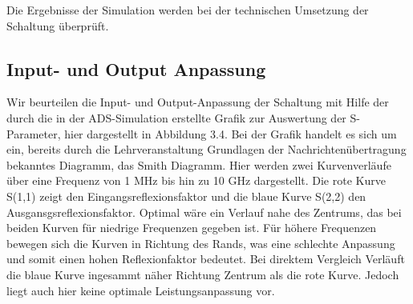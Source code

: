 Die Ergebnisse der Simulation werden bei der technischen Umsetzung der Schaltung überprüft. 
\subsection{Input- und Output Anpassung}
Wir beurteilen die Input- und Output-Anpassung der Schaltung mit Hilfe der durch die in der ADS-Simulation erstellte Grafik 
zur Auswertung der S-Parameter, hier dargestellt in Abbildung 3.4. Bei der Grafik handelt es sich um ein, bereits durch die 
Lehrveranstaltung Grundlagen der Nachrichtenübertragung bekanntes Diagramm,  das Smith Diagramm. Hier werden zwei 
Kurvenverläufe über eine Frequenz von 1 MHz bis hin zu 10 GHz dargestellt. Die rote Kurve S(1,1) zeigt den 
Eingangsreflexionsfaktor und die blaue Kurve S(2,2) den Ausgansgsreflexionsfaktor. Optimal wäre ein Verlauf nahe des
Zentrums, das bei beiden Kurven für niedrige Frequenzen gegeben ist. Für höhere Frequenzen bewegen sich die Kurven in 
Richtung des Rands, was eine schlechte Anpassung  und somit einen hohen Reflexionfaktor bedeutet. Bei direktem Vergleich 
Verläuft die blaue Kurve ingesammt näher Richtung Zentrum als die rote Kurve. Jedoch liegt auch hier keine optimale 
Leistungsanpassung vor.
\clearpage
%
%


